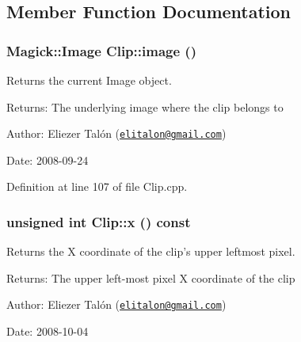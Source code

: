 \subsection{Member Function Documentation}
\hypertarget{class_clip_488b36e7868e93a60123135b0a4ac2ea}{
\subsubsection[image]{\setlength{\rightskip}{0pt plus 5cm}Magick::Image Clip::image ()}}
\label{class_clip_488b36e7868e93a60123135b0a4ac2ea}


Returns the current Image object. 

\begin{Desc}
\item[Returns:]The underlying image where the clip belongs to\end{Desc}
\begin{Desc}
\item[Author:]Eliezer Talón (\href{mailto:elitalon@gmail.com}{\tt elitalon@gmail.com}) \end{Desc}
\begin{Desc}
\item[Date:]2008-09-24 \end{Desc}


Definition at line 107 of file Clip.cpp.\hypertarget{class_clip_de984337b7b13fb63a3d3b1797b544c8}{
\subsubsection[x]{\setlength{\rightskip}{0pt plus 5cm}unsigned int Clip::x () const}}
\label{class_clip_de984337b7b13fb63a3d3b1797b544c8}


Returns the X coordinate of the clip's upper leftmost pixel. 

\begin{Desc}
\item[Returns:]The upper left-most pixel X coordinate of the clip\end{Desc}
\begin{Desc}
\item[Author:]Eliezer Talón (\href{mailto:elitalon@gmail.com}{\tt elitalon@gmail.com}) \end{Desc}
\begin{Desc}
\item[Date:]2008-10-04 \end{Desc}


